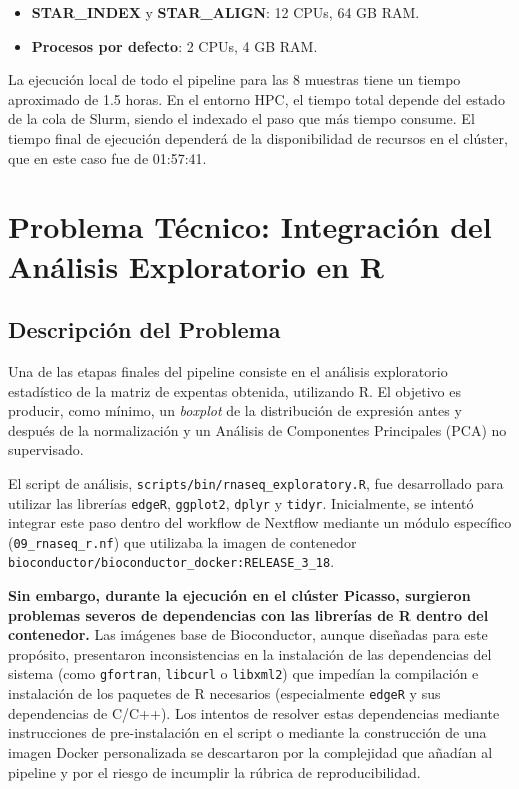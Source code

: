 \documentclass[11pt,a4paper]{article}
\begin{document}
\begin{itemize}
    \item \textbf{STAR\_INDEX} y \textbf{STAR\_ALIGN}: 12 CPUs, 64 GB RAM.
    \item \textbf{Procesos por defecto}: 2 CPUs, 4 GB RAM.
\end{itemize}

La ejecución local de todo el pipeline para las 8 muestras tiene un tiempo aproximado de 1.5 horas. En el entorno HPC, el tiempo total depende del estado de la cola de Slurm, siendo el indexado el paso que más tiempo consume. El tiempo final de ejecución dependerá de la disponibilidad de recursos en el clúster, que en este caso fue de 01:57:41.

\section{Problema Técnico: Integración del Análisis Exploratorio en R}
\label{sec:problema_r}

\subsection{Descripción del Problema}

Una de las etapas finales del pipeline consiste en el análisis exploratorio estadístico de la matriz de expentas obtenida, utilizando R. El objetivo es producir, como mínimo, un \textit{boxplot} de la distribución de expresión antes y después de la normalización y un Análisis de Componentes Principales (PCA) no supervisado.

El script de análisis, \texttt{scripts/bin/rnaseq\_exploratory.R}, fue desarrollado para utilizar las librerías \texttt{edgeR}, \texttt{ggplot2}, \texttt{dplyr} y \texttt{tidyr}. Inicialmente, se intentó integrar este paso dentro del workflow de Nextflow mediante un módulo específico (\texttt{09\_rnaseq\_r.nf}) que utilizaba la imagen de contenedor \texttt{bioconductor/bioconductor\_docker:RELEASE\_3\_18}.

\textbf{Sin embargo, durante la ejecución en el clúster Picasso, surgieron problemas severos de dependencias con las librerías de R dentro del contenedor.} Las imágenes base de Bioconductor, aunque diseñadas para este propósito, presentaron inconsistencias en la instalación de las dependencias del sistema (como \texttt{gfortran}, \texttt{libcurl} o \texttt{libxml2}) que impedían la compilación e instalación de los paquetes de R necesarios (especialmente \texttt{edgeR} y sus dependencias de C/C++). Los intentos de resolver estas dependencias mediante instrucciones de pre-instalación en el script o mediante la construcción de una imagen Docker personalizada se descartaron por la complejidad que añadían al pipeline y por el riesgo de incumplir la rúbrica de reproducibilidad.
\end{document}

